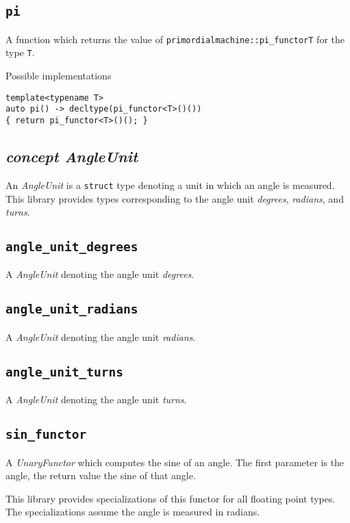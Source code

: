 \documentclass[oneside]{article}
\begin{document}
\subsection{\texttt{pi}}
A function which returns the value of \texttt{primordialmachine::pi\_functor\textlangle T\textrangle}
for the type \texttt{T}.

\noindent{}Possible implementations
\begin{verbatim}
template<typename T>
auto pi() -> decltype(pi_functor<T>()())
{ return pi_functor<T>()(); }
\end{verbatim}

\subsection{\textit{concept AngleUnit}}
An \textit{AngleUnit} is a \texttt{struct} type denoting a unit in which an angle is measured.
This library provides types corresponding to the angle unit \textit{degrees}, \textit{radians},
and \textit{turns}.

\subsection{\texttt{angle\_unit\_degrees}}
A \textit{AngleUnit} denoting the angle unit \textit{degrees}.
\subsection{\texttt{angle\_unit\_radians}}
A \textit{AngleUnit} denoting the angle unit \textit{radians}.
\subsection{\texttt{angle\_unit\_turns}}
A \textit{AngleUnit} denoting the angle unit \textit{turns}.

\subsection{\texttt{sin\_functor}}
A \textit{UnaryFunctor} which computes the
sine
of an angle.
The first parameter is the angle, the return value the sine of that angle.

\noindent{}This library provides specializations of this functor for all floating point types.
The specializations assume the angle is measured in radians.\\
\end{document}
